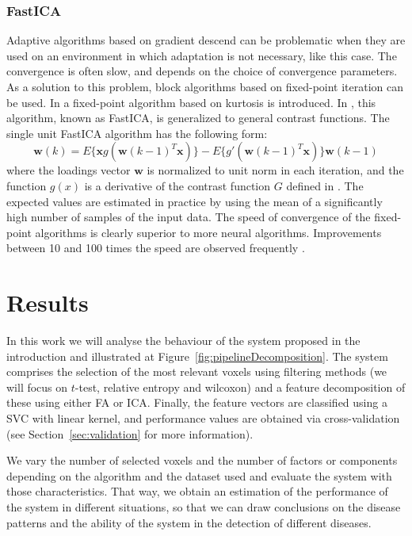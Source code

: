 \subsubsection{FastICA}
Adaptive algorithms based on gradient descend can be problematic when they are used on an environment in which adaptation is not necessary, like this case. The convergence is often slow, and depends on the choice of convergence parameters. As a solution to this problem, block algorithms based on fixed-point iteration \cite{Oja1997,FastICA99} can be used. In \cite{Oja1997} a fixed-point algorithm based on kurtosis is introduced. In \cite{FastICA99}, this algorithm, known as FastICA, is generalized to general contrast functions. The single unit FastICA algorithm has the following form:
\begin{equation}
\mathbf{w}(k) = E\lbrace\mathbf{x}g(\mathbf{w}(k-1)^T\mathbf{x})\rbrace -E\lbrace g'(\mathbf{w}(k-1)^T\mathbf{x})\rbrace\mathbf{w}(k-1)
\end{equation}
where the loadings vector $\mathbf{w}$ is normalized to unit norm in each iteration, and the function $g(x)$ is a derivative of the contrast function $G$ defined in \cite{Hyvarinen1999}. The expected values are estimated in practice by using the mean of a significantly high number of samples of the input data. 
The speed of convergence of the fixed-point algorithms is clearly superior to more neural algorithms. Improvements between 10 and 100 times the speed are observed frequently \cite{Giannakopoulos1998}. 


\section{Results}
In this work we will analyse the behaviour of the system proposed in the introduction and illustrated at Figure~\ref{fig:pipelineDecomposition}. The system comprises the selection of the most relevant voxels using filtering methods (we will focus on $t$-test, relative entropy and wilcoxon) and a feature decomposition of these using either \ac{FA} or \ac{ICA}. Finally, the feature vectors are classified using a \ac{SVC} with linear kernel, and performance values are obtained via cross-validation (see Section~\ref{sec:validation} for more information). 

We vary the number of selected voxels and the number of factors or components depending on the algorithm and the dataset used and evaluate the system with those characteristics. That way, we obtain an estimation of the performance of the system in different situations, so that we can draw conclusions on the disease patterns and the ability of the system in the detection of different diseases. 

